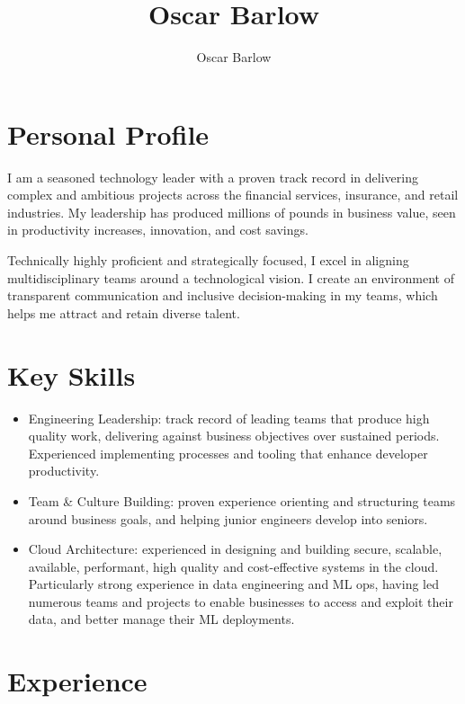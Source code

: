 \documentclass[a4paper]{scrartcl}
\author{Oscar Barlow}
\title{Oscar Barlow}
\date{}
\begin{document}
\maketitle

\section*{Personal Profile}
 { %
  \setlength{\parskip}{6pt plus 2pt minus 1pt}
  I am a seasoned technology leader with a proven track record in
  delivering complex and ambitious projects across the financial services,
  insurance,
  and retail industries. My leadership has produced
  millions of pounds in business value, seen in
  productivity increases, innovation, and cost savings.

  Technically highly proficient and strategically focused, I excel in aligning
  multidisciplinary
  teams around a technological vision. I create an environment of
  transparent communication and inclusive decision-making in my teams, which helps me attract and retain diverse talent.
 } %

\section*{Key Skills}
\begin{itemize}
	\item Engineering Leadership: track record of leading teams that produce high quality work, delivering against business objectives over sustained periods. Experienced implementing processes and tooling that enhance developer productivity.
	\item Team \& Culture Building: proven experience orienting and structuring teams around business goals, and helping junior engineers develop into seniors.
	\item Cloud Architecture: experienced in designing and building secure,
	      scalable, available, performant, high quality and cost-effective
	      systems in the
	      cloud. Particularly strong experience in data engineering and ML ops, having led numerous teams and projects to enable businesses to access and exploit their data, and better manage their ML deployments.
\end{itemize}

\section*{Experience}
\end{document}
